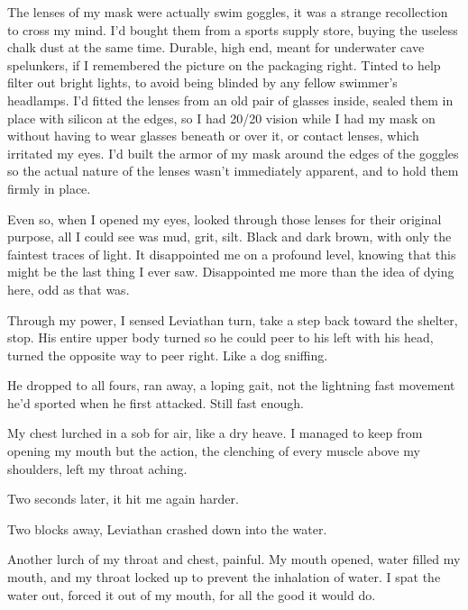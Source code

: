 The lenses of my mask were actually swim goggles, it was a strange recollection to cross my mind.  I'd bought them from a sports supply store, buying the useless chalk dust at the same time.  Durable, high end, meant for underwater cave spelunkers, if I remembered the picture on the packaging right.  Tinted to help filter out bright lights, to avoid being blinded by any fellow swimmer's headlamps.  I'd fitted the lenses from an old pair of glasses inside, sealed them in place with silicon at the edges, so I had 20/20 vision while I had my mask on without having to wear glasses beneath or over it, or contact lenses, which irritated my eyes.  I'd built the armor of my mask around the edges of the goggles so the actual nature of the lenses wasn't immediately apparent, and to hold them firmly in place.



Even so, when I opened my eyes, looked through those lenses for their original purpose, all I could see was mud, grit, silt.  Black and dark brown, with only the faintest traces of light.  It disappointed me on a profound level, knowing that this might be the last thing I ever saw.  Disappointed me more than the idea of dying here, odd as that was.



Through my power, I sensed Leviathan turn, take a step back toward the shelter, stop.  His entire upper body turned so he could peer to his left with his head, turned the opposite way to peer right.  Like a dog sniffing.



He dropped to all fours, ran away, a loping gait, not the lightning fast movement he'd sported when he first attacked.  Still fast enough.



My chest lurched in a sob for air, like a dry heave.  I managed to keep from opening my mouth but the action, the clenching of every muscle above my shoulders, left my throat aching.



Two seconds later, it hit me again harder.



Two blocks away, Leviathan crashed down into the water.



Another lurch of my throat and chest, painful.  My mouth opened, water filled my mouth, and my throat locked up to prevent the inhalation of water.  I spat the water out, forced it out of my mouth, for all the good it would do.



